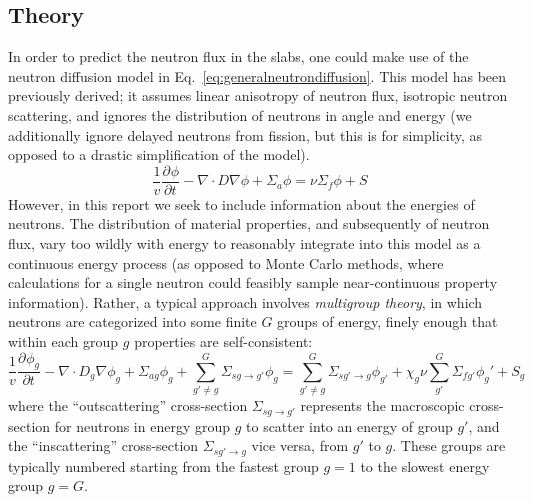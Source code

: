 \documentclass[11pt]{article} %
\begin{document}
\subsection{Theory}
In order to predict the neutron flux in the slabs, one could make use of the neutron diffusion model in Eq.~\ref{eq:generalneutrondiffusion}.
This model has been previously derived; it assumes linear anisotropy of neutron flux, isotropic neutron scattering, and ignores the distribution of neutrons in angle and energy (we additionally ignore delayed neutrons from fission, but this is for simplicity, as opposed to a drastic simplification of the model).
\newcommand{\pd}[3]{\frac{\partial^{#3}#1}{\partial{#2}^{#3}}}
\begin{equation}
    \frac{1}{v}\pd{\phi}{t}{} - \nabla\cdot D \nabla\phi + \Sigma_a\phi = 
    \nu\Sigma_f\phi+S
    \label{eq:generalneutrondiffusion}
\end{equation}
However, in this report we seek to include information about the energies of neutrons.
The distribution of material properties, and subsequently of neutron flux, vary too wildly with energy to reasonably integrate into this model as a continuous energy process (as opposed to Monte Carlo methods, where calculations for a single neutron could feasibly sample near-continuous property information).
Rather, a typical approach involves \emph{multigroup theory}, in which neutrons are categorized into some finite $G$ groups of energy, finely enough that within each group $g$ properties are self-consistent:
\begin{equation}
    \frac{1}{v}\pd{\phi_g}{t}{} - \nabla\cdot D_g\nabla\phi_g + \Sigma_{ag}\phi_g + \sum_{g'\neq g}^{G}\Sigma_{sg\rightarrow g'}\phi_g=\sum_{g'\neq g}^{G}\Sigma_{sg'\rightarrow g}\phi_{g'} + \chi_g\nu\sum_{g'}^{G}{\Sigma_{fg'}\phi_g'} + S_g
    \label{eq:multigroup-diff}
\end{equation}
\newcommand{\outscat}{\Sigma_{sg\rightarrow g'}}
\newcommand{\inscat}{\Sigma_{sg'\rightarrow g}}
where the ``outscattering'' cross-section $\outscat$ represents the macroscopic cross-section for neutrons in energy group $g$ to scatter into an energy of group $g'$, and the ``inscattering'' cross-section $\inscat$ vice versa, from $g'$ to $g$.
These groups are typically numbered starting from the fastest group $g=1$ to the slowest energy group $g=G$.\\
\newcommand{\SigRem}{\Sigma_{Rg}}
\end{document}
